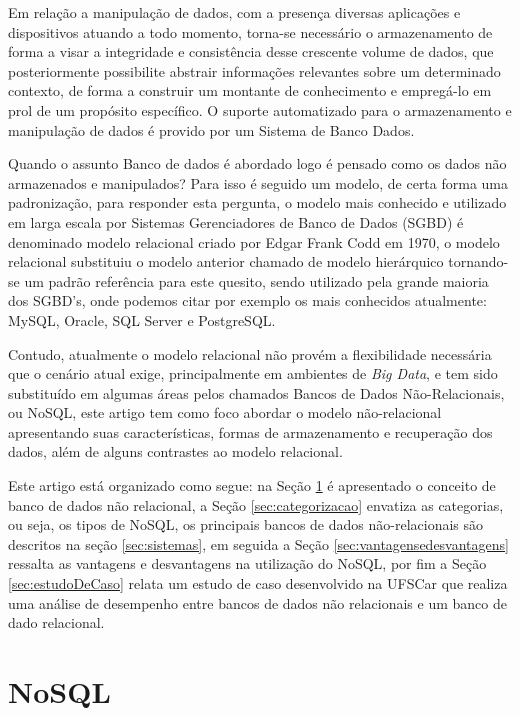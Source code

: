 \documentclass[12pt]{article}
\begin{document}
Em relação a manipulação de dados, com a presença diversas aplicações e dispositivos atuando a todo momento, torna-se necessário o armazenamento de forma a visar a integridade e consistência desse crescente volume de dados, que posteriormente possibilite abstrair informações relevantes sobre um determinado contexto, de forma a construir um montante de conhecimento e empregá-lo em prol de um propósito específico. O suporte automatizado para o armazenamento e manipulação de dados é provido por um Sistema de Banco Dados.

Quando o assunto Banco de dados é abordado logo é pensado como os dados não armazenados e manipulados? Para isso é seguido um modelo, de certa forma uma padronização, para responder esta pergunta, o modelo mais conhecido e utilizado em larga escala por Sistemas Gerenciadores de Banco de Dados (SGBD) é denominado modelo relacional \cite{codd:1970} criado por Edgar Frank Codd em 1970, o modelo relacional substituiu o modelo anterior chamado de modelo hierárquico tornando-se um padrão referência para este quesito, sendo utilizado pela grande maioria dos SGBD's, onde podemos citar por exemplo os mais conhecidos atualmente: MySQL, Oracle, SQL Server e PostgreSQL.\cite{brito2010bancos}

Contudo, atualmente o modelo relacional não provém a flexibilidade necessária que o cenário atual exige, principalmente em ambientes de \textit{Big Data}, e tem sido substituído em algumas áreas pelos chamados Bancos de Dados Não-Relacionais, ou NoSQL, este artigo tem como foco abordar o modelo não-relacional apresentando suas características, formas de armazenamento e recuperação dos dados, além de alguns contrastes ao modelo relacional.

Este artigo está organizado como segue: na Seção \ref{sec:nosql} é apresentado o conceito de banco de dados não relacional, a Seção \ref{sec:categorizacao} envatiza as categorias, ou seja, os tipos de NoSQL, os principais bancos de dados não-relacionais são descritos na seção \ref{sec:sistemas}, em seguida a Seção \ref{sec:vantagensedesvantagens} ressalta as vantagens e desvantagens na utilização do NoSQL, por fim a Seção \ref{sec:estudoDeCaso} relata um estudo de caso desenvolvido na UFSCar que realiza uma análise de desempenho entre bancos de dados não relacionais e um banco de dado relacional.

\section{NoSQL} 
\label{sec:nosql}
\end{document}
